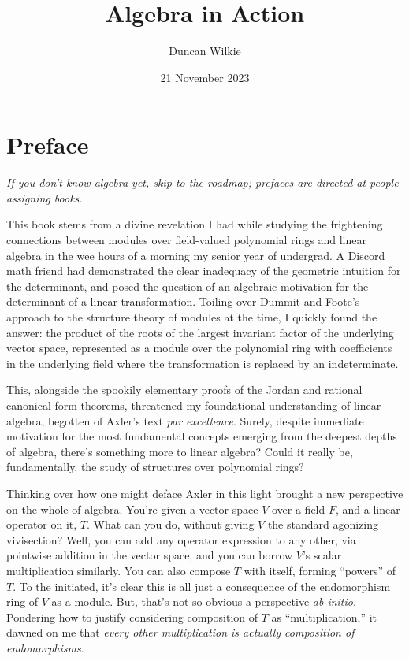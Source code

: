 \documentclass{book}
\title{Algebra in Action}
\author{Duncan Wilkie}
\date{21 November 2023}
\begin{document}
\maketitle

\chapter{Preface}

\textit{If you don't know algebra yet, skip to the roadmap; prefaces are directed at people assigning books.}
\vspace{20pt}

This book stems from a divine revelation I had while studying the frightening connections
between modules over field-valued polynomial rings and linear algebra in the wee hours of a morning my senior year of undergrad.
A Discord math friend had demonstrated the clear inadequacy of the geometric intuition for the determinant,
and posed the question of an algebraic motivation for the determinant of a linear transformation.
Toiling over Dummit and Foote's approach to the structure theory of modules at the time, I quickly found the answer:
the product of the roots of the largest invariant factor of the underlying vector space, represented as a module over the polynomial ring
with coefficients in the underlying field where the transformation is replaced by an indeterminate.

This, alongside the spookily elementary proofs of the Jordan and rational canonical form theorems,
threatened my foundational understanding of linear algebra, begotten of Axler's text \textit{par excellence}.
Surely, despite immediate motivation for the most fundamental concepts emerging from the deepest depths of algebra,
there's something more to linear algebra?
Could it really be, fundamentally, the study of structures over polynomial rings?

Thinking over how one might deface Axler in this light brought a new perspective on the whole of algebra.
You're given a vector space $V$ over a field $F$, and a linear operator on it, $T$.
What can you do, without giving $V$ the standard agonizing vivisection?
Well, you can add any operator expression to any other, via pointwise addition in the vector space,
and you can borrow $V$'s scalar multiplication similarly.
You can also compose $T$ with itself, forming ``powers'' of $T$.
To the initiated, it's clear this is all just a consequence of the endomorphism ring of $V$ as a module.
But, that's not so obvious a perspective \textit{ab initio}.
Pondering how to justify considering composition of $T$ as ``multiplication,'' it dawned on me that
\textit{every other multiplication is actually composition of endomorphisms}.
\end{document}
